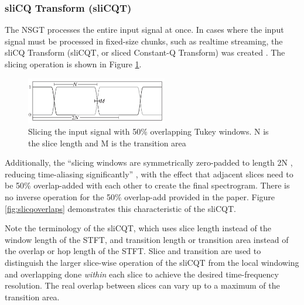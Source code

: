 \documentclass[report.tex]{subfiles}
\begin{document}
\newpagefill

\subsubsection{sliCQ Transform (sliCQT)}
\label{sec:theoryslicqt}

The NSGT processes the entire input signal at once. In cases where the input signal must be processed in fixed-size chunks, such as realtime streaming, the sliCQ Transform (sliCQT, or sliced Constant-Q Transform) was created \parencite{invertiblecqt, slicq}. The slicing operation is shown in Figure \ref{fig:slicqtukeys}.

\begin{figure}[ht]
	\centering
	\includegraphics[width=0.55\textwidth]{./images-misc/slicq_windows.png}
	\caption{Slicing the input signal with 50\% overlapping Tukey windows. N is the slice length and M is the transition area \parencite{slicq}}
	\label{fig:slicqtukeys}
\end{figure}

Additionally, the ``slicing windows are symmetrically zero-padded to length 2N , reducing time-aliasing significantly'' \parencite[10]{slicq}, with the effect that adjacent slices need to be 50\% overlap-added with each other to create the final spectrogram. There is no inverse operation for the 50\% overlap-add provided in the paper. Figure \ref{fig:slicqoverlaps} demonstrates this characteristic of the sliCQT.

Note the terminology of the sliCQT, which uses slice length instead of the window length of the STFT, and transition length or transition area instead of the overlap or hop length of the STFT. Slice and transition are used to distinguish the larger slice-wise operation of the sliCQT from the local windowing and overlapping done \textit{within} each slice to achieve the desired time-frequency resolution. The real overlap between slices can vary up to a maximum of the transition area.
\end{document}
